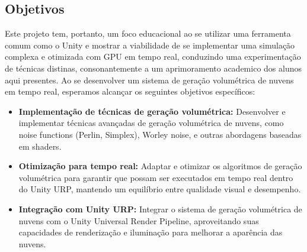 \subsection{Objetivos}

Este projeto tem, portanto, um foco educacional ao se utilizar uma ferramenta comum como o Unity e mostrar a viabilidade de se implementar uma simulação complexa e otimizada com GPU em tempo real, conduzindo uma experimentação de técnicas distinas, consonantemente a um aprimoramento academico dos alunos aqui presentes. Ao se desenvolver um sistema de geração volumétrica de nuvens em tempo real, esperamos alcançar os seguintes objetivos específicos:

\begin{itemize}
    \item \textbf{Implementação de técnicas de geração volumétrica:} Desenvolver e implementar técnicas avançadas de geração volumétrica de nuvens, como noise functions (Perlin, Simplex), Worley noise, e outras abordagens baseadas em shaders.
    \item \textbf{Otimização para tempo real:} Adaptar e otimizar os algoritmos de geração volumétrica para garantir que possam ser executados em tempo real dentro do Unity URP, mantendo um equilíbrio entre qualidade visual e desempenho.
    \item \textbf{Integração com Unity URP:} Integrar o sistema de geração volumétrica de nuvens com o Unity Universal Render Pipeline, aproveitando suas capacidades de renderização e iluminação para melhorar a aparência das nuvens.
\end{itemize}